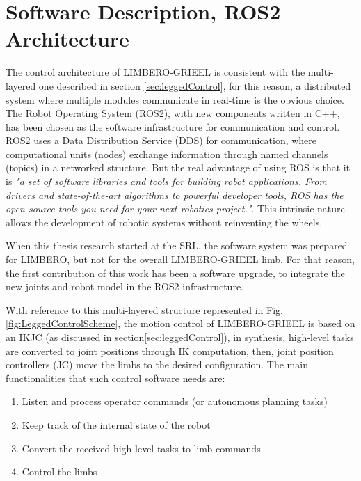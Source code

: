 \section{Software Description, ROS2 Architecture}
\label{sec:software_ros2}

The control architecture of LIMBERO-GRIEEL is consistent with the multi-layered one described in section \ref{sec:leggedControl}, for this reason, a distributed system where multiple modules communicate in real-time is the obvious choice. The Robot Operating System (ROS2)\cite{ROS1_2009}\cite{ROS2_2022}\cite{ROS2_2023}, with new components written in C++, has been chosen as the software infrastructure for communication and control.
ROS2 uses a Data Distribution Service (DDS) for communication, where computational units (nodes) exchange information through named channels (topics) in a networked structure. But the real advantage of using ROS is that it is \textit{"a set of software libraries and tools for building robot applications. From drivers and state-of-the-art algorithms to powerful developer tools, ROS has the open-source tools you need for your next robotics project."}\cite{ROS2HumbleDocs}. This intrinsic nature allows the development of robotic systems without reinventing the wheels.  

When this thesis research started at the SRL, the software system was prepared for LIMBERO, but not for the overall LIMBERO-GRIEEL limb. For that reason, the first contribution of this work has been a software upgrade, to integrate the new joints and robot model in the ROS2 infrastructure. 

With reference to this multi-layered structure represented in Fig.\ref{fig:LeggedControlScheme}, the motion control of LIMBERO-GRIEEL is based on an IKJC (as discussed in section\ref{sec:leggedControl}), in synthesis, high-level tasks are converted to joint positions through IK computation, then, joint position controllers (JC) move the limbs to the desired configuration.  
The main functionalities that such control software needs are: 
\begin{enumerate}
    \setlength\itemsep{-0.7em} 
    \item Listen and process operator commands (or autonomous planning tasks)
    \item Keep track of the internal state of the robot
    \item Convert the received high-level tasks to limb commands 
    \item Control the limbs 
\end{enumerate}

